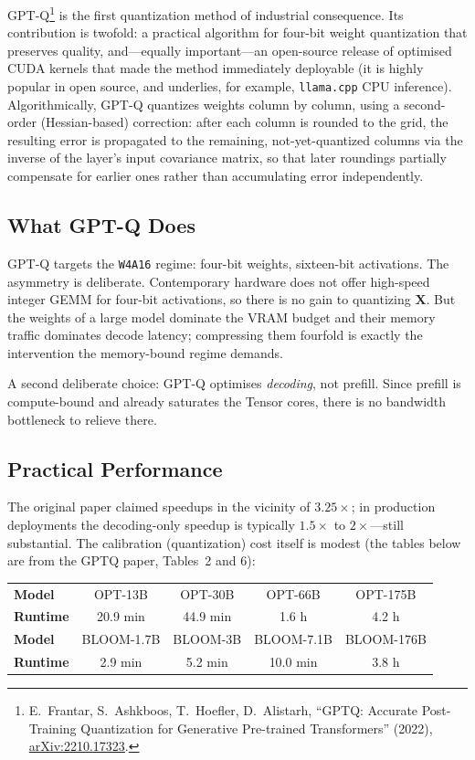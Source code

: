 \documentclass[11pt,a4paper]{article}
\theoremstyle{definition}
\theoremstyle{remark}
\theoremstyle{plain}
\newcommand{\arxivlink}[1]{\href{https://arxiv.org/abs/#1}{arXiv:#1}}
\begin{document}
GPT-Q\footnote{E.\ Frantar, S.\ Ashkboos, T.\ Hoefler, D.\ Alistarh,
``GPTQ: Accurate Post-Training Quantization for Generative Pre-trained
Transformers'' (2022), \arxivlink{2210.17323}.} is the first quantization
method of industrial consequence. Its contribution is twofold: a practical
algorithm for four-bit weight quantization that preserves quality, and---equally
important---an open-source release of optimised CUDA kernels that made the
method immediately deployable (it is highly popular in open source, and
underlies, for example, \texttt{llama.cpp} CPU inference).
Algorithmically, GPT-Q quantizes weights column by column, using a
second-order (Hessian-based) correction: after each column is rounded to
the grid, the resulting error is propagated to the remaining,
not-yet-quantized columns via the inverse of the layer's input covariance
matrix, so that later roundings partially compensate for earlier ones
rather than accumulating error independently.

\subsection{What GPT-Q Does}

GPT-Q targets the \texttt{W4A16} regime: four-bit weights, sixteen-bit
activations. The asymmetry is deliberate. Contemporary hardware does not
offer high-speed integer GEMM for four-bit activations, so there is no
gain to quantizing $\mathbf{X}$. But the weights of a large model dominate
the VRAM budget and their memory traffic dominates decode latency;
compressing them fourfold is exactly the intervention the memory-bound
regime demands.

A second deliberate choice: GPT-Q optimises \emph{decoding}, not prefill.
Since prefill is compute-bound and already saturates the Tensor cores,
there is no bandwidth bottleneck to relieve there.

\subsection{Practical Performance}

The original paper claimed speedups in the vicinity of $3.25\times$; in
production deployments the decoding-only speedup is typically $1.5\times$
to $2\times$---still substantial. The calibration (quantization) cost
itself is modest (the tables below are from the GPTQ paper, Tables~2 and
6):

\begin{center}
\renewcommand{\arraystretch}{1.25}
\begin{tabular}{@{}lcccc@{}}
\toprule
\textbf{Model} & OPT-13B & OPT-30B & OPT-66B & OPT-175B \\
\textbf{Runtime} & 20.9 min & 44.9 min & 1.6 h & 4.2 h \\
\midrule
\textbf{Model} & BLOOM-1.7B & BLOOM-3B & BLOOM-7.1B & BLOOM-176B \\
\textbf{Runtime} & 2.9 min & 5.2 min & 10.0 min & 3.8 h \\
\bottomrule
\end{tabular}
\end{center}
\end{document}
